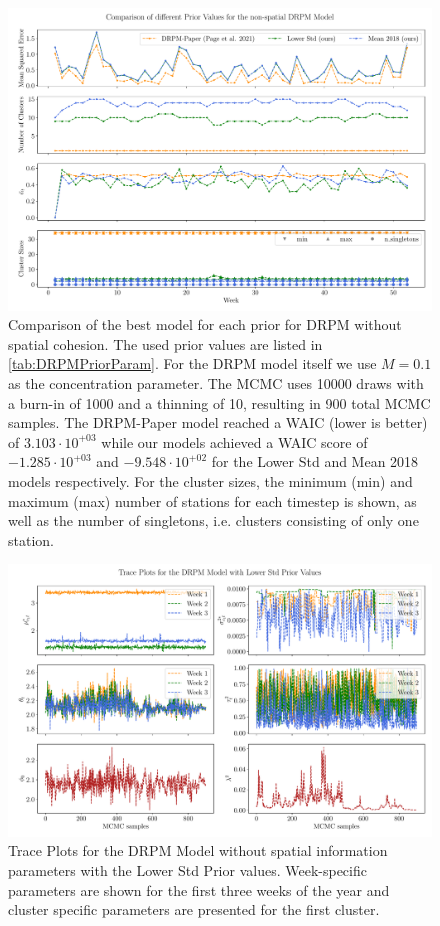 \documentclass[12pt,a4paper]{article}
\begin{document}
\begin{figure}
    \centering
    \includegraphics[width=.95\linewidth]{./imgs/drpm/drpm_base_models_comparison.pdf}
    \caption{Comparison of the best model for each prior for DRPM without spatial cohesion.
    The used prior values are listed in \cref{tab:DRPMPriorParam}. For the DRPM model itself we use
    $M=0.1$ as the concentration parameter. The MCMC uses 10000 draws with a burn-in of 1000 and a
    thinning of 10, resulting in 900 total MCMC samples. The DRPM-Paper model reached a WAIC (lower is better) of
    $3.103 \cdot 10^{+03}$ while our models achieved a WAIC score of $-1.285 \cdot 10^{+03}$ and
    $-9.548 \cdot 10^{+02}$ for the Lower Std and Mean 2018 models respectively. For the cluster sizes,
    the minimum (min) and maximum (max) number of stations for each timestep is shown, as well as the number of
    singletons, i.e. clusters consisting of only one station.}
    \label{fig:drpm_base_models_comparison}
\end{figure}

\begin{figure}
    \centering
    \includegraphics[width=.99\linewidth]{./imgs/drpm/drpm_lower_std_trace_plots.pdf}
    \caption{Trace Plots for the DRPM Model without spatial information parameters with the Lower Std Prior values. 
    Week-specific
    parameters are shown for the first three weeks of the year and cluster specific parameters are
    presented for the first cluster.}
    \label{fig:drpm_lower_std_trace_plots}
\end{figure}
\end{document}
